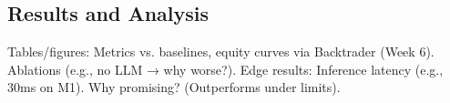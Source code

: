 \subsection{Results and Analysis}
\label{sec:results}

Tables/figures: Metrics vs. baselines, equity curves via Backtrader (Week 6). Ablations (e.g., no LLM → why worse?). Edge results: Inference latency (e.g., 30ms on M1). Why promising? (Outperforms under limits).
